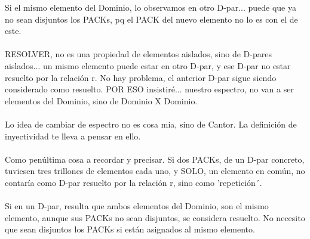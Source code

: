 	\noindent
	Si el mismo elemento del Dominio, lo observamos en otro D-par... puede que ya no sean disjuntos los PACKs, pq el PACK del nuevo elemento no lo es con el de este.
	\\\\

	\noindent
	RESOLVER, no es una propiedad de elementos aislados, sino de D-pares aislados... un mismo elemento puede estar en otro D-par, y ese D-par no estar resuelto por la relación r. No hay problema, el anterior D-par sigue siendo considerado como resuelto. POR ESO insistiré... nuestro espectro, no van a ser elementos del Dominio, sino de Dominio X Dominio.
	\\\\
	
	\noindent
	Lo idea de cambiar de espectro no es cosa mia, sino de Cantor. La definición de inyectividad te lleva a pensar en ello.
	\\\\
	
	\noindent
	Como penúltima cosa a recordar y precisar. Si dos PACKs, de un D-par concreto, tuviesen tres trillones de elementos cada uno, y SOLO, un elemento en común, no contaría como D-par resuelto por la relación r, sino como 'repetición´.
	\\\\
	
	\noindent
	Si en un D-par, resulta que ambos elementos del Dominio, son el mismo elemento, aunque sus PACKs no sean disjuntos, se considera resuelto. No necesito que sean disjuntos los PACKs si están asignados al mismo elemento.
	\\\\